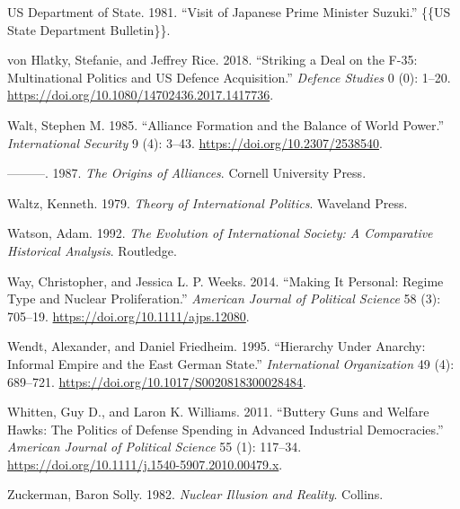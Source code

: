 \documentclass[
  12,
  letterpaper,
  DIV=11,
  numbers=noendperiod]{scrartcl}
\newlength{\cslhangindent}
\newlength{\cslentryspacingunit} %
\newenvironment{CSLReferences}[2] %
 {%
  \setlength{\parindent}{0pt}
  \ifodd #1
  \let\oldpar\par
  \def\par{\hangindent=\cslhangindent\oldpar}
  \fi
  \setlength{\parskip}{#2\cslentryspacingunit}
 }%
 {}
\begin{document}
\begin{CSLReferences}{1}{0}
\leavevmode{}%
US Department of State. 1981. {``Visit of {Japanese Prime Minister
Suzuki}.''} \{\{US State Department Bulletin\}\}.

\leavevmode{}%
von Hlatky, Stefanie, and Jeffrey Rice. 2018. {``Striking a Deal on the
{F-35}: Multinational Politics and {US} Defence Acquisition.''}
\emph{Defence Studies} 0 (0): 1--20.
\url{https://doi.org/10.1080/14702436.2017.1417736}.

\leavevmode{}%
Walt, Stephen M. 1985. {``Alliance {Formation} and the {Balance} of
{World Power}.''} \emph{International Security} 9 (4): 3--43.
\url{https://doi.org/10.2307/2538540}.

\leavevmode{}%
---------. 1987. \emph{The {Origins} of {Alliances}}. {Cornell
University Press}.

\leavevmode{}%
Waltz, Kenneth. 1979. \emph{Theory of {International Politics}}.
{Waveland Press}.

\leavevmode{}%
Watson, Adam. 1992. \emph{The {Evolution} of {International Society}: {A
Comparative Historical Analysis}}. {Routledge}.

\leavevmode{}%
Way, Christopher, and Jessica L. P. Weeks. 2014. {``Making {It
Personal}: {Regime Type} and {Nuclear Proliferation}.''} \emph{American
Journal of Political Science} 58 (3): 705--19.
\url{https://doi.org/10.1111/ajps.12080}.

\leavevmode{}%
Wendt, Alexander, and Daniel Friedheim. 1995. {``Hierarchy Under
Anarchy: Informal Empire and the {East German} State.''}
\emph{International Organization} 49 (4): 689--721.
\url{https://doi.org/10.1017/S0020818300028484}.

\leavevmode{}%
Whitten, Guy D., and Laron K. Williams. 2011. {``Buttery {Guns} and
{Welfare Hawks}: {The Politics} of {Defense Spending} in {Advanced
Industrial Democracies}.''} \emph{American Journal of Political Science}
55 (1): 117--34. \url{https://doi.org/10.1111/j.1540-5907.2010.00479.x}.

\leavevmode{}%
Zuckerman, Baron Solly. 1982. \emph{Nuclear Illusion and Reality}.
{Collins}.

\end{CSLReferences}
\end{document}
